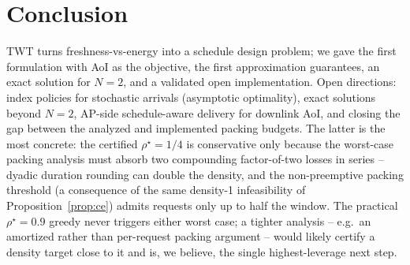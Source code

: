 \section{Conclusion}
\label{sec:conclusion}

TWT turns freshness-vs-energy into a schedule design problem; we gave the
first formulation with AoI as the objective, the first approximation
guarantees, an exact solution for $N{=}2$, and a validated open
implementation. Open directions: index policies for stochastic arrivals
(asymptotic optimality), exact solutions beyond $N{=}2$, AP-side
schedule-aware delivery for downlink AoI, and closing the gap between the
analyzed and implemented packing budgets. The latter is the most concrete:
the certified $\rho^\star{=}1/4$ is conservative only because the worst-case
packing analysis must absorb two compounding factor-of-two losses in series
-- dyadic duration rounding can double the density, and the non-preemptive
packing threshold (a consequence of the same density-1 infeasibility of
Proposition~\ref{prop:ce}) admits requests only up to half the window. The
practical $\rho^\star{=}0.9$ greedy never triggers either worst case; a
tighter analysis -- e.g.\ an amortized rather than per-request packing
argument -- would likely certify a density target close to it and is, we
believe, the single highest-leverage next step.
